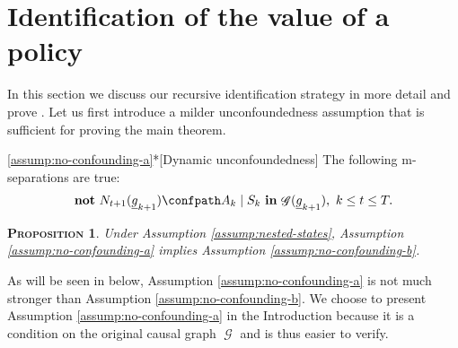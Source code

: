 \documentclass[12pt,a4paper]{article}
\newenvironment{assumption*}[1]{%
  \renewcommand\themanualtheoreminner{#1}%
  \manualtheoreminner
}{\endmanualtheoreminner}
\newtheorem{proposition}[theorem]{\normalfont\scshape  Proposition}
\theoremstyle{definition}
\newcommand{\ingraph}[1]{~\textnormal{\bf in}\,#1}
\newcommand{\textnot}{\textnormal{\bf not}~}
\DeclareMathOperator{\gG}{\mathscr{G}}
\begin{document}
\section{Identification of the value of a policy}\label{sec:identication}
In this section we discuss our recursive identification strategy in more detail
and prove . %
Let us first introduce a milder unconfoundedness
assumption that is sufficient for proving the main theorem.
\begin{assumption*}{\ref{assump:no-confounding-a}*}[Dynamic unconfoundedness] \label{assump:no-confounding-b}
    The following m-separations are true:
    \begin{align*} %
        \textnot N_{t+1}(\underline{g}_{k+1}) \confpath A_k \mid S_k
      \ingraph{\gG(\underline{g}_{k+1})}, ~ k \leq t \leq T.
    \end{align*}
\end{assumption*}
\begin{proposition}\label{prop:strong-unconfoundedness-implies-weak}
    Under Assumption \ref{assump:nested-states}, Assumption \ref{assump:no-confounding-a} implies Assumption \ref{assump:no-confounding-b}.
\end{proposition}

As will be seen in  below, %
Assumption \ref{assump:no-confounding-a} is not much stronger than
Assumption \ref{assump:no-confounding-b}. We choose to present
Assumption \ref{assump:no-confounding-a} in the Introduction
because it is a condition on the original causal graph $\gG$ and is
thus easier to verify.
\end{document}
